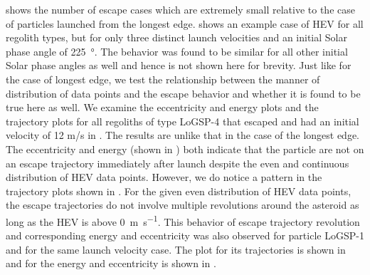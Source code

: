  shows the number of escape cases which are extremely small relative to the case of particles launched from the longest edge.  shows an example case of \gls{HEV} for all regolith types, but for only three distinct launch velocities and an initial Solar phase angle of \SI{225}{\degree}. The behavior was found to be similar for all other initial Solar phase angles as well and hence is not shown here for brevity. Just like for the case of longest edge, we test the relationship between the manner of distribution of data points and the escape behavior and whether it is found to be true here as well. We examine the eccentricity and energy plots and the trajectory plots for all regoliths of type LoGSP-4 that escaped and had an initial velocity of 12 m/s in . The results are unlike that in the case of the longest edge. The eccentricity and energy (shown in ) both indicate that the particle are not on an escape trajectory immediately after launch despite the even and continuous distribution of \gls{HEV} data points. However, we do notice a pattern in the trajectory plots shown in . For the given even distribution of \gls{HEV} data points, the escape trajectories do not involve multiple revolutions around the asteroid as long as the \gls{HEV} is above \SI{0}{\metre\per\second}. This behavior of escape trajectory revolution and corresponding energy and eccentricity was also observed for particle LoGSP-1 and for the same launch velocity case. The plot for its trajectories is shown in  and for the energy and eccentricity is shown in .

